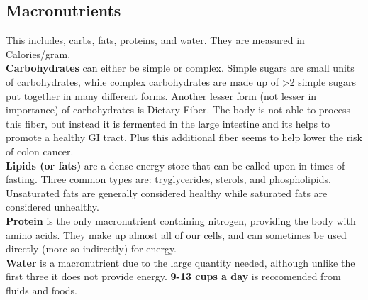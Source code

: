 \documentclass[letterpaper, 11pt]{article}
\begin{document}
\subsection{Macronutrients}
\label{sec:orgf1ec0b2}
This includes, carbs, fats, proteins, and water. They are measured in Calories/gram.\\
\textbf{Carbohydrates} can either be simple or complex. Simple sugars are small units of carbohydrates, while complex carbohydrates are made up of >2 simple sugars put together in many different forms. Another lesser form (not lesser in importance) of carbohydrates is Dietary Fiber. The body is not able to process this fiber, but instead it is fermented in the large intestine and its helps to promote a healthy GI tract. Plus this additional fiber seems to help lower the risk of colon cancer.\\
\textbf{Lipids (or fats)} are a dense energy store that can be called upon in times of fasting. Three common types are: tryglycerides, sterols, and phospholipids. Unsaturated fats are generally considered healthy while saturated fats are considered unhealthy.\\
\textbf{Protein} is the only macronutrient containing nitrogen, providing the body with amino acids. They make up almost all of our cells, and can sometimes be used directly (more so indirectly) for energy.\\
\textbf{Water} is a macronutrient due to the large quantity needed, although unlike the first three it does not provide energy. \textbf{9-13 cups a day} is reccomended from fluids and foods.\\
\end{document}
